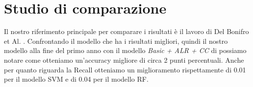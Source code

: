 \documentclass[../../Report.tex]{subfiles}
\begin{document}
\section{Studio di comparazione}
    Il nostro riferimento principale per comparare i risultati è il lavoro di Del Bonifro et Al. \cite{DelBonifro}. Confrontando il modello che ha i risultati migliori, quindi il nostro modello alla fine del primo anno con il modello \emph{Basic +  ALR + CC} di \cite{DelBonifro} possiamo notare come otteniamo un'accuracy migliore di circa 2 punti percentuali. Anche per quanto riguarda la Recall otteniamo un miglioramento rispettamente di 0.01 per il modello SVM e di 0.04 per il modello RF. 
    
\end{document}
